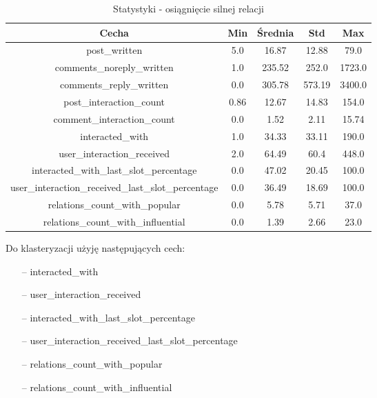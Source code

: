 \documentclass[polish,12pt]{aghthesis}
\begin{document}
\begin{table}[ht]
    \centering
  \begin{center}
  \begin{tabular}{|c|c|c|c|c|}
  \hline
  Cecha & Min & Średnia & Std & Max  \\
  \hline
post\_written & 5.0 & 16.87 & 12.88 & 79.0 \\
\hline
comments\_noreply\_written & 1.0 & 235.52 & 252.0 & 1723.0 \\
\hline
comments\_reply\_written & 0.0 & 305.78 & 573.19 & 3400.0 \\
\hline
post\_interaction\_count & 0.86 & 12.67 & 14.83 & 154.0 \\
\hline
comment\_interaction\_count & 0.0 & 1.52 & 2.11 & 15.74 \\
\hline
interacted\_with & 1.0 & 34.33 & 33.11 & 190.0 \\
\hline
user\_interaction\_received & 2.0 & 64.49 & 60.4 & 448.0 \\
\hline
interacted\_with\_last\_slot\_percentage & 0.0 & 47.02 & 20.45 & 100.0 \\
\hline
user\_interaction\_received\_last\_slot\_percentage & 0.0 & 36.49 & 18.69 & 100.0 \\
\hline
relations\_count\_with\_popular & 0.0 & 5.78 & 5.71 & 37.0 \\
\hline
relations\_count\_with\_influential & 0.0 & 1.39 & 2.66 & 23.0 \\
\hline
  \end{tabular}
\end{center}
\caption{Statystyki - osiągnięcie silnej relacji}
\label{tab:rr3}
\end{table}

\FloatBarrier

Do klasteryzacji użyję następujących cech:

\begin{itemize}
    \setlength\itemsep{0,005em}
    \item[--] interacted\_with 
    \item[--] user\_interaction\_received 
    \item[--] interacted\_with\_last\_slot\_percentage 
    \item[--] user\_interaction\_received\_last\_slot\_percentage 
    \item[--] relations\_count\_with\_popular 
    \item[--] relations\_count\_with\_influential 
\end{itemize}
\end{document}
